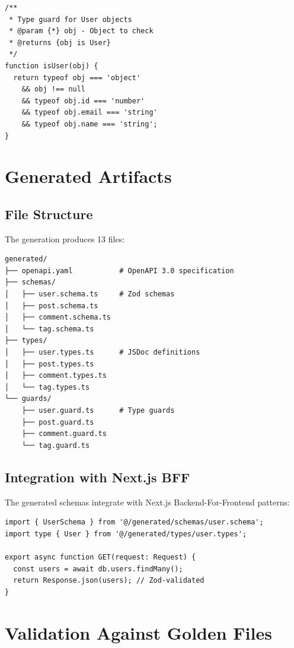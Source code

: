 \begin{verbatim}
/**
 * Type guard for User objects
 * @param {*} obj - Object to check
 * @returns {obj is User}
 */
function isUser(obj) {
  return typeof obj === 'object'
    && obj !== null
    && typeof obj.id === 'number'
    && typeof obj.email === 'string'
    && typeof obj.name === 'string';
}
\end{verbatim}

\section{Generated Artifacts}

\subsection{File Structure}

The generation produces 13 files:

\begin{verbatim}
generated/
├── openapi.yaml           # OpenAPI 3.0 specification
├── schemas/
│   ├── user.schema.ts     # Zod schemas
│   ├── post.schema.ts
│   ├── comment.schema.ts
│   └── tag.schema.ts
├── types/
│   ├── user.types.ts      # JSDoc definitions
│   ├── post.types.ts
│   ├── comment.types.ts
│   └── tag.types.ts
└── guards/
    ├── user.guard.ts      # Type guards
    ├── post.guard.ts
    ├── comment.guard.ts
    └── tag.guard.ts
\end{verbatim}

\subsection{Integration with Next.js BFF}

The generated schemas integrate with Next.js Backend-For-Frontend patterns:

\begin{verbatim}
import { UserSchema } from '@/generated/schemas/user.schema';
import type { User } from '@/generated/types/user.types';

export async function GET(request: Request) {
  const users = await db.users.findMany();
  return Response.json(users); // Zod-validated
}
\end{verbatim}

\section{Validation Against Golden Files}

